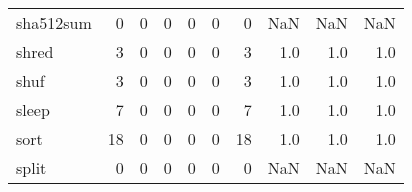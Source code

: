 \begin{longtable}{lrrrrrrrrr}
sha512sum &                                       0 &                                                  0 &                                                  0 &                                                  0 &                                                  0 &                                                  0 &                                                NaN &                                    NaN &                                  NaN \\
shred     &                                       3 &                                                  0 &                                                  0 &                                                  0 &                                                  0 &                                                  3 &                                                1.0 &                                    1.0 &                                  1.0 \\
shuf      &                                       3 &                                                  0 &                                                  0 &                                                  0 &                                                  0 &                                                  3 &                                                1.0 &                                    1.0 &                                  1.0 \\
sleep     &                                       7 &                                                  0 &                                                  0 &                                                  0 &                                                  0 &                                                  7 &                                                1.0 &                                    1.0 &                                  1.0 \\
sort      &                                      18 &                                                  0 &                                                  0 &                                                  0 &                                                  0 &                                                 18 &                                                1.0 &                                    1.0 &                                  1.0 \\
split     &                                       0 &                                                  0 &                                                  0 &                                                  0 &                                                  0 &                                                  0 &                                                NaN &                                    NaN &                                  NaN \\

\end{longtable}
